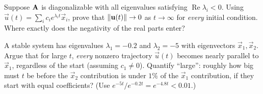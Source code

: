\begin{exercise}
\label{ch25:ex-stability}
Suppose $\mathbf{A}$ is diagonalizable with all eigenvalues satisfying
$\operatorname{Re}\lambda_i<0$. Using $\vec{u}(t)=\sum_i c_i e^{\lambda_i t}
\vec{x}_i$, prove that $\lVert\mathbf{u}(t)\rVert\to0$ as $t\to\infty$ for \emph{every}
initial condition. Where exactly does the negativity of the real parts enter?
\end{exercise}

\begin{exercise}
\label{ch25:ex-slowmode}
A stable system has eigenvalues $\lambda_1=-0.2$ and $\lambda_2=-5$ with
eigenvectors $\vec{x}_1,\vec{x}_2$. Argue that for large $t$, \emph{every}
nonzero trajectory $\vec{u}(t)$ becomes nearly parallel to $\vec{x}_1$, regardless
of the start (assuming $c_1\neq0$). Quantify ``large'': roughly how big must $t$
be before the $\vec{x}_2$ contribution is under $1\%$ of the $\vec{x}_1$
contribution, if they start with equal coefficients? (Use $e^{-5t}/e^{-0.2t}=
e^{-4.8t}<0.01$.)
\end{exercise}
